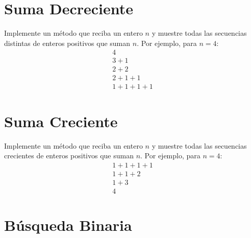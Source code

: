 \section{Suma Decreciente}  
Implemente un método que reciba un entero \( n \) y muestre todas las secuencias distintas de enteros positivos que suman \( n \). Por ejemplo, para \( n = 4 \):  
\begin{equation}
    \begin{aligned}
    4 \\ 
    3+1 \\ 
    2+2 \\ 
    2+1+1 \\ 
    1+1+1+1   
    \end{aligned}
\end{equation}

\section{Suma Creciente}  
Implemente un método que reciba un entero \( n \) y muestre todas las secuencias crecientes de enteros positivos que suman \( n \). Por ejemplo, para \( n = 4 \):  
\begin{equation}
    \begin{aligned}
    1+1+1+1 \\
    1+1+2 \\
    1+3 \\
    4
    \end{aligned}
\end{equation}

\section{Búsqueda Binaria}  
  



